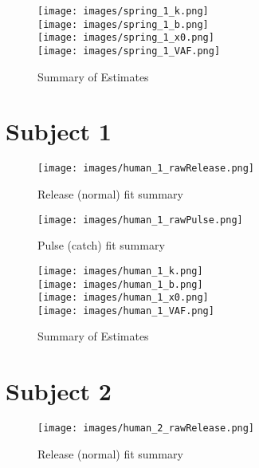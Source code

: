 \documentclass[12pt]{spie}
\begin{document}
\begin{figure}[H]
\begin{center}
\texttt{[image: images/spring\_1\_k.png]} \\
\texttt{[image: images/spring\_1\_b.png]} \\
\texttt{[image: images/spring\_1\_x0.png]} \\
\texttt{[image: images/spring\_1\_VAF.png]} \\
\caption[]{Summary of Estimates}
\end{center}
\end{figure}

\section{Subject 1}

\begin{figure}[H]
\begin{center}
\texttt{[image: images/human\_1\_rawRelease.png]}
\caption[]{Release (normal) fit summary}
\end{center}
\end{figure}

\begin{figure}[H]
\begin{center}
\texttt{[image: images/human\_1\_rawPulse.png]}
\caption[]{Pulse (catch) fit summary}
\end{center}
\end{figure}

\begin{figure}[H]
\begin{center}
\texttt{[image: images/human\_1\_k.png]} \\
\texttt{[image: images/human\_1\_b.png]} \\
\texttt{[image: images/human\_1\_x0.png]} \\
\texttt{[image: images/human\_1\_VAF.png]} \\
\caption[]{Summary of Estimates}
\end{center}
\end{figure}

\section{Subject 2}

\begin{figure}[H]
\begin{center}
\texttt{[image: images/human\_2\_rawRelease.png]}
\caption[]{Release (normal) fit summary}
\end{center}
\end{figure}
\end{document}
